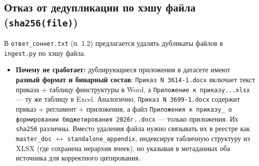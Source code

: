 \documentclass[10pt,a4paper]{article}
\begin{document}
\subsection{Отказ от дедупликации по хэшу файла (\texttt{sha256(file)})}
В \texttt{ответ\_соннет.txt} (п. 1.2) предлагается удалять дубликаты файлов в \texttt{ingest.py} по хэшу файла.
\begin{itemize}
    \item \textbf{Почему не сработает:} дублирующиеся приложения в датасете имеют \textbf{разный формат и бинарный состав}: \texttt{Приказ N 3614-1.docx} включает текст приказа + таблицу финструктуры в Word, а \texttt{Приложение к приказу...xlsx} — ту же таблицу в Excel. Аналогично, \texttt{Приказ N 3699-1.docx} содержит приказ + регламент + приложения, а файл \texttt{Приложения к приказу\_ о формировании бюджетирования 2026г..docx} — только приложения. Их \texttt{sha256} различны. Вместо удаления файла нужно связывать их в реестре как \texttt{master\_doc} $\leftrightarrow$ \texttt{standalone\_appendix}, индексируя табличную структуру из XLSX (где сохранена иерархия ячеек), но указывая в метаданных оба источника для корректного цитирования.
\end{itemize}
\end{document}
